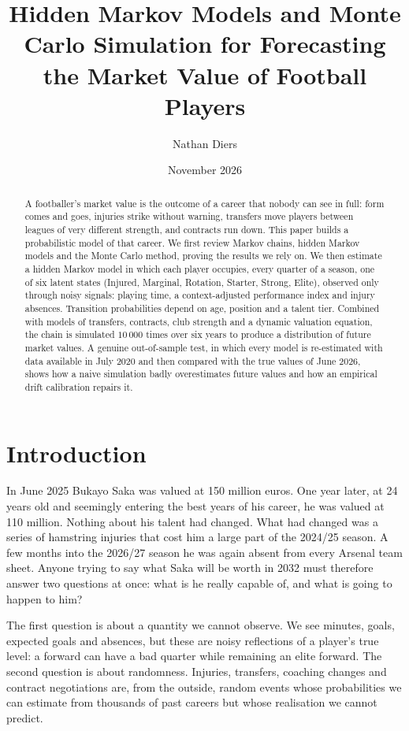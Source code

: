 \documentclass[11pt]{amsart}
\title{Hidden Markov Models and Monte Carlo Simulation for Forecasting the Market Value of Football Players}
\author{Nathan Diers}
\date{November 2026}
\theoremstyle{definition}
\theoremstyle{remark}
\begin{document}
\begin{abstract}
A footballer's market value is the outcome of a career that nobody can see in full: form comes and goes, injuries strike without warning, transfers move players between leagues of very different strength, and contracts run down. This paper builds a probabilistic model of that career. We first review Markov chains, hidden Markov models and the Monte Carlo method, proving the results we rely on. We then estimate a hidden Markov model in which each player occupies, every quarter of a season, one of six latent states (Injured, Marginal, Rotation, Starter, Strong, Elite), observed only through noisy signals: playing time, a context-adjusted performance index and injury absences. Transition probabilities depend on age, position and a talent tier. Combined with models of transfers, contracts, club strength and a dynamic valuation equation, the chain is simulated $10\,000$ times over six years to produce a distribution of future market values. A genuine out-of-sample test, in which every model is re-estimated with data available in July 2020 and then compared with the true values of June 2026, shows how a naive simulation badly overestimates future values and how an empirical drift calibration repairs it.
\end{abstract}

\maketitle
\tableofcontents

\section{Introduction}

In June 2025 Bukayo Saka was valued at 150 million euros. One year later, at 24 years old and seemingly entering the best years of his career, he was valued at 110 million. Nothing about his talent had changed. What had changed was a series of hamstring injuries that cost him a large part of the 2024/25 season. A few months into the 2026/27 season he was again absent from every Arsenal team sheet. Anyone trying to say what Saka will be worth in 2032 must therefore answer two questions at once: what is he really capable of, and what is going to happen to him?

The first question is about a quantity we cannot observe. We see minutes, goals, expected goals and absences, but these are noisy reflections of a player's true level: a forward can have a bad quarter while remaining an elite forward. The second question is about randomness. Injuries, transfers, coaching changes and contract negotiations are, from the outside, random events whose probabilities we can estimate from thousands of past careers but whose realisation we cannot predict.
\end{document}
